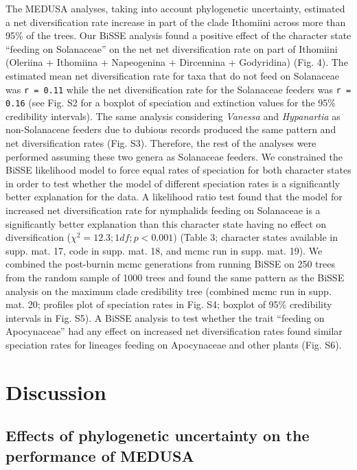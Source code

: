 \documentclass[10pt]{article}
\begin{document}
The MEDUSA analyses, taking into account phylogenetic uncertainty,
estimated a net diversification rate increase in part of the clade
Ithomiini across more than 95\% of the trees. Our BiSSE analysis found a
positive effect of the character state ``feeding on Solanaceae'' on the
net net diversification rate on part of Ithomiini (Oleriina + Ithomiina
+ Napeogenina + Dircennina + Godyridina) (Fig. 4). The estimated mean
net diversification rate for taxa that do not feed on Solanaceae was
\texttt{r = 0.11} while the net diversification rate for the Solanaceae
feeders was \texttt{r = 0.16} (see Fig. S2 for a boxplot of speciation
and extinction values for the 95\% credibility intervals). The same
analysis considering \emph{Vanessa} and \emph{Hypanartia} as
non-Solanaceae feeders due to dubious records produced the same pattern
and net diversification rates (Fig. S3). Therefore, the rest of the
analyses were performed assuming these two genera as Solanaceae feeders.
We constrained the BiSSE likelihood model to force equal rates of
speciation for both character states in order to test whether the model
of different speciation rates is a significantly better explanation for
the data. A likelihood ratio test found that the model for increased net
diversification rate for nymphalids feeding on Solanaceae is a
significantly better explanation than this character state having no
effect on diversification (\(\chi^2 = 12.3; 1 df; p < 0.001\)) (Table 3;
character states available in supp. mat. 17, code in supp. mat. 18, and
mcmc run in supp. mat. 19). We combined the post-burnin mcmc generations
from running BiSSE on 250 trees from the random sample of 1000 trees and
found the same pattern as the BiSSE analysis on the maximum clade
credibility tree (combined mcmc run in supp. mat. 20; profiles plot of
speciation rates in Fig. S4; boxplot of 95\% credibility intervals in
Fig. S5). A BiSSE analysis to test whether the trait ``feeding on
Apocynaceae'' had any effect on increased net diversification rates
found similar speciation rates for lineages feeding on Apocynaceae and
other plants (Fig. S6).

\section*{Discussion}

\subsection*{Effects of phylogenetic uncertainty on the performance of
MEDUSA}
\end{document}
